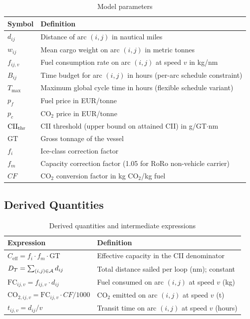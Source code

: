 \begin{table}[h]
\centering
\caption{Model parameters}
\label{tab:notation_params}
\begin{tabular}{lp{9cm}}
  \toprule
  Symbol & Definition \\
  \midrule
  $d_{ij}$ & Distance of arc $(i,j)$ in nautical miles \\
  $w_{ij}$ & Mean cargo weight on arc $(i,j)$ in metric tonnes \\
  $f_{ij,v}$ & Fuel consumption rate on arc $(i,j)$ at speed $v$ in kg/nm \\
  $B_{ij}$ & Time budget for arc $(i,j)$ in hours (per-arc schedule constraint) \\
  $T_{\max}$ & Maximum global cycle time in hours (flexible schedule variant) \\
  $p_f$ & Fuel price in EUR/tonne \\
  $p_c$ & CO$_2$ price in EUR/tonne \\
  $\mathrm{CII}_{\mathrm{thr}}$ & CII threshold (upper bound on attained CII) in g/GT$\cdot$nm \\
  $\mathrm{GT}$ & Gross tonnage of the vessel \\
  $f_i$ & Ice-class correction factor \\
  $f_m$ & Capacity correction factor (1.05 for RoRo non-vehicle carrier) \\
  $CF$ & CO$_2$ conversion factor in kg CO$_2$/kg fuel \\
  \bottomrule
\end{tabular}
\end{table}

\subsection{Derived Quantities}
\label{app:notation:derived}

\begin{table}[h]
\centering
\caption{Derived quantities and intermediate expressions}
\label{tab:notation_derived}
\begin{tabular}{lp{9cm}}
  \toprule
  Expression & Definition \\
  \midrule
  $C_{\mathrm{eff}} = f_i \cdot f_m \cdot \mathrm{GT}$ & Effective capacity in the CII denominator \\
  $D_T = \sum_{(i,j) \in \mathcal{A}} d_{ij}$ & Total distance sailed per loop (nm); constant \\
  $\mathrm{FC}_{ij,v} = f_{ij,v} \cdot d_{ij}$ & Fuel consumed on arc $(i,j)$ at speed $v$ (kg) \\
  $\mathrm{CO}_{2,ij,v} = \mathrm{FC}_{ij,v} \cdot CF / 1000$ & CO$_2$ emitted on arc $(i,j)$ at speed $v$ (t) \\
  $t_{ij,v} = d_{ij}/v$ & Transit time on arc $(i,j)$ at speed $v$ (hours) \\
  \bottomrule
\end{tabular}
\end{table}

